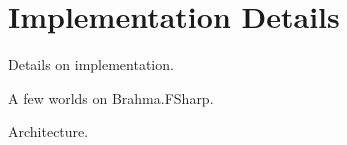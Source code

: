 \section{Implementation Details}

Details on implementation. 

A few worlds on Brahma.FSharp.

Architecture.
